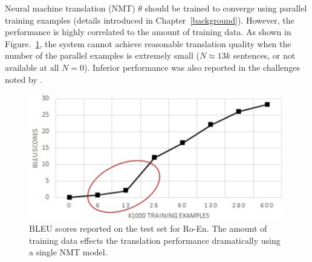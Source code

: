 

Neural machine translation (NMT) $\theta$  should be trained to converge using parallel training examples (details introduced in Chapter~\ref{background}). However, the performance is highly correlated to the amount of training data.  As shown in Figure.~\ref{cp5.fig.data_size}, the system cannot achieve reasonable translation quality when the number of the parallel examples is extremely small ($N \approx 13k$ sentences,  or not available at all $N =0$).  Inferior performance was also reported in the challenges noted by .

\begin{figure}[hptb]
	\centering
	\includegraphics[width=0.85\linewidth]{figs/ulr/data_matters.pdf}
\caption{\label{cp5.fig.data_size} BLEU scores reported on the test set for Ro-En. The amount of training data effects the translation performance dramatically using a single NMT model.}
 \end{figure}

